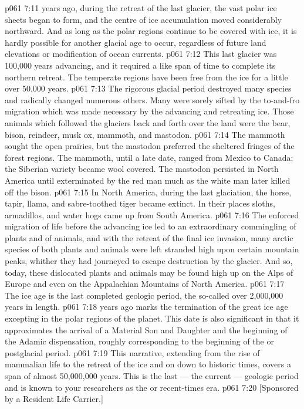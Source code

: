 \vs p061 7:11 \pc {} years ago, during the retreat of the last glacier, the vast polar ice sheets began to form, and the centre of ice accumulation moved considerably northward. And as long as the polar regions continue to be covered with ice, it is hardly possible for another glacial age to occur, regardless of future land elevations or modification of ocean currents.
\vs p061 7:12 This last glacier was 100,000 years advancing, and it required a like span of time to complete its northern retreat. The temperate regions have been free from the ice for a little over 50,000 years.
\vs p061 7:13 The rigorous glacial period destroyed many species and radically changed numerous others. Many were sorely sifted by the to\hyp{}and\hyp{}fro migration which was made necessary by the advancing and retreating ice. Those animals which followed the glaciers back and forth over the land were the bear, bison, reindeer, musk ox, mammoth, and mastodon.
\vs p061 7:14 The mammoth sought the open prairies, but the mastodon preferred the sheltered fringes of the forest regions. The mammoth, until a late date, ranged from Mexico to Canada; the Siberian variety became wool covered. The mastodon persisted in North America until exterminated by the red man much as the white man later killed off the bison.
\vs p061 7:15 In North America, during the last glaciation, the horse, tapir, llama, and sabre\hyp{}toothed tiger became extinct. In their places sloths, armadillos, and water hogs came up from South America.
\vs p061 7:16 The enforced migration of life before the advancing ice led to an extraordinary commingling of plants and of animals, and with the retreat of the final ice invasion, many arctic species of both plants and animals were left stranded high upon certain mountain peaks, whither they had journeyed to escape destruction by the glacier. And so, today, these dislocated plants and animals may be found high up on the Alps of Europe and even on the Appalachian Mountains of North America.
\vs p061 7:17 \pc The ice age is the last completed geologic period, the so\hyp{}called  over 2,000,000 years in length.
\vs p061 7:18 \pc {} years ago marks the termination of the great ice age excepting in the polar regions of the planet. This date is also significant in that it approximates the arrival of a Material Son and Daughter and the beginning of the Adamic dispensation, roughly corresponding to the beginning of the  or postglacial period.
\vs p061 7:19 \pc This narrative, extending from the rise of mammalian life to the retreat of the ice and on down to historic times, covers a span of almost 50,000,000 years. This is the last --- the current --- geologic period and is known to your researchers as the  or recent\hyp{}times era.
\vsetoff
\vs p061 7:20 [Sponsored by a Resident Life Carrier.]
